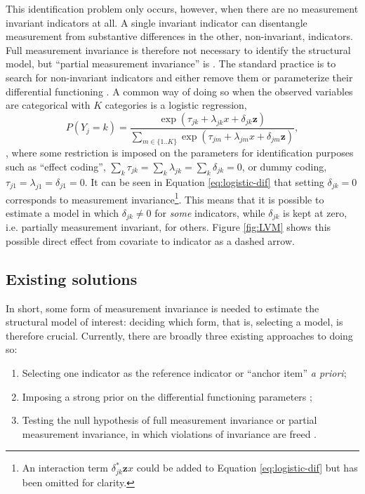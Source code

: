 This identification problem only occurs, however, when there are no measurement invariant indicators at all. A single invariant indicator can disentangle measurement from substantive differences in the other, non-invariant, indicators. Full measurement invariance is therefore not necessary to identify the structural model, but ``partial measurement invariance'' is \citep{byrne1989testing}. The standard practice is to search for non-invariant indicators and either remove them or parameterize their differential functioning \citep{Holland:1993aa}. 
A common way of doing so when the observed variables are categorical with $K$ categories is a logistic regression, 
\begin{equation}
	P(Y_j = k) = \frac{\exp(\tau_{jk} + \lambda_{jk} x + \delta_{jk} \mathbf{z})}{\sum_{m \in \{1..K\}} \exp(\tau_{jm} + \lambda_{jm} x + \delta_{jm} \mathbf{z})},
	\label{eq:logistic-dif}
\end{equation}
\citep{mellenbergh1989item,kankaras2010testing}, where some restriction is imposed on the parameters for identification purposes such as ``effect coding'', $\sum_k \tau_{jk} = \sum_k \lambda_{jk} =\sum_k \delta_{jk} = 0$, or dummy coding, $\tau_{j1} = \lambda_{j1} = \delta_{j1} = 0$. 
It can be seen in Equation \ref{eq:logistic-dif} that setting $\delta_{jk} = 0$ corresponds to measurement invariance\footnote{An interaction term $\delta_{jk}^* \mathbf{z}x$ could be added to Equation \ref{eq:logistic-dif} but has been omitted for clarity.}. This means that it is possible to estimate a model in which $\delta_{jk} \neq 0$ for \emph{some} indicators, while $\delta_{jk}$ is kept at zero, i.e. partially measurement invariant, for others. 
Figure \ref{fig:LVM} shows this possible direct effect from covariate to indicator as a dashed arrow. 

\subsection{Existing solutions}

In short, some form of measurement invariance is needed to estimate the structural model of interest: deciding which form, that is, selecting a model, is therefore crucial. Currently, there are broadly three existing approaches to doing so:
\begin{enumerate}
	\item Selecting one indicator as the reference indicator or ``anchor item'' \emph{a priori};
	\item Imposing a strong prior on the differential functioning parameters \citep{muthen2012bayesian};
	\item Testing the null hypothesis of full measurement invariance \citep{steenkamp_assessing_1998,french2006confirmatory} or partial measurement invariance, in which violations of invariance are freed  \citep{byrne1989testing,saris2009testing}.
\end{enumerate}

